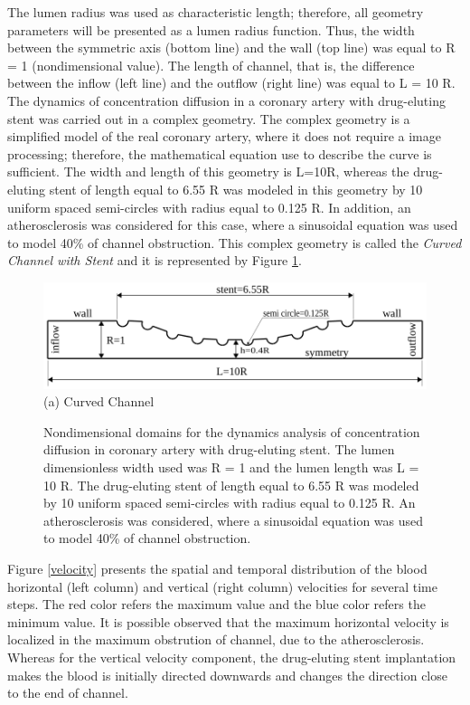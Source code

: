\documentclass[10pt,fleqn,a4paper,twoside]{article}
\begin{document}
\smallskip
{The lumen radius was used as characteristic
length; therefore,
all geometry parameters will be presented
as a lumen radius function.
Thus, the width
between the symmetric axis (bottom line)
and the wall (top line) was equal to R = 1 (nondimensional value).
The length of channel, that is, the difference between the
inflow (left line) and the outflow (right line) was
equal to L = 10 R.}
The dynamics of concentration diffusion in 
a coronary artery with drug-eluting stent
was carried out in a complex geometry.
The complex geometry is a simplified model 
of the real coronary artery, where it does not require a image 
processing; therefore, the
mathematical equation use to describe the curve is sufficient. 
The width and length of this
geometry is L=10R, whereas the drug-eluting stent of length equal to
6.55 R was modeled in this geometry by 10 uniform 
spaced semi-circles with radius equal
to 0.125 R. In addition, an atherosclerosis was 
considered for this case, where a sinusoidal equation
was used to model 40\% of channel obstruction.
This complex geometry is called the 
\textit{Curved Channel with Stent} and it is represented
by Figure \ref{geometry}. 




\begin{figure}[H]
     \begin{center}
      \includegraphics[scale=0.6]{./figure/CurvedStrut.png}\\
     (a) Curved Channel
     \end{center}
     \label{geometry}
     \caption{
Nondimensional domains for the dynamics analysis of 
concentration diffusion in coronary artery with drug-eluting stent. 
The lumen dimensionless width used was R = 1 and 
the lumen length was L = 10 R. The
drug-eluting stent of length equal to 6.55 R was modeled 
by 10 uniform spaced semi-circles with radius
equal to 0.125 R. An atherosclerosis was considered, 
where a sinusoidal equation was used to model 40\% of
channel obstruction.
}
\end{figure}

\smallskip
Figure \ref{velocity} presents the spatial and 
temporal distribution of the blood horizontal (left
column) and vertical (right column) velocities for
several time steps. The red color refers the maximum value and 
the blue color refers the minimum value.
It is possible observed that the maximum horizontal velocity is
localized in the maximum obstrution of channel,
due to the atherosclerosis. 
Whereas for the vertical velocity component, 
the drug-eluting stent implantation makes the blood is initially directed downwards and changes the direction close to the end
of channel.
\end{document}
